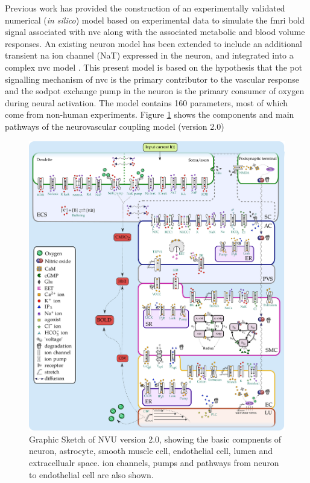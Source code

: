 Previous work \cite{Mathias2018} has provided  the construction of an experimentally validated numerical (\textit{in silico}) model based on experimental data to simulate the \gls{fmri} \gls{bold} signal associated with \gls{nvc} along with the associated metabolic and blood volume responses. An existing neuron model \citep{Mathias2017, Mathias2017a} has been extended to include an additional transient \gls{na} ion channel (NaT) expressed in the neuron, and integrated into a complex \gls{nvc} model \citep{Dormanns2015, Dormanns2016, Kenny2017a}. This present model is based on the hypothesis that the \gls{pot} signalling mechanism of \gls{nvc} is the primary contributor to the vascular response and the \gls{sodpot} exchange pump in the neuron is the primary consumer of oxygen during neural activation. The model contains 160 parameters, most of which come from non-human experiments. 
Figure \ref{fig:nvu20} shows the components and main pathways of the neurovascular coupling model (version 2.0) \\

\begin{figure}[h!]
\centering
\includegraphics[width=0.7\linewidth]{Figures/nvu_20}
\caption[Graphic Sketch of NVU version 2.0]{Graphic Sketch of NVU version 2.0, showing the basic compnents of neuron, astrocyte, smooth muscle cell, endothelial cell, lumen and extracellualr space. ion channels, pumps and pathways from neuron to endothelial cell are also shown.}
\label{fig:nvu20}
\end{figure}

